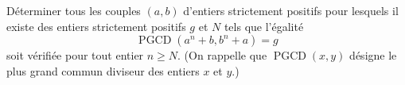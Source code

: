 Déterminer tous les couples $(a, b)$ d'entiers strictement positifs pour lesquels il existe des entiers
strictement positifs $g$ et $N$ tels que l'égalité
\[
\operatorname{PGCD}(a^n + b, b^n + a) = g
\]
soit vérifiée pour tout entier $n \geqslant N$. (On rappelle que $\operatorname{PGCD}(x, y)$ désigne le
plus grand commun diviseur des entiers $x$ et $y$.)
